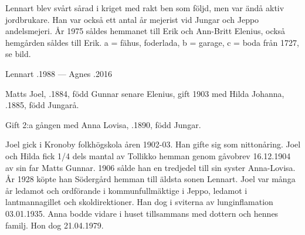 
Lennart blev svårt sårad i kriget med rakt ben som följd, men var ändå aktiv jordbrukare. Han var också ett antal år mejerist vid Jungar och Jeppo andelsmejeri. År 1975 såldes hemmanet till Erik och Ann-Britt Elenius, också hemgården såldes till Erik. a = fähus, foderlada, b = garage, c = boda från 1727, se bild.

Lennart .1988 --- Agnes .2016\jhvspace{}

%
Matts Joel, .1884, född Gunnar senare Elenius, gift 1903 med Hilda Johanna, .1885, född Jungarå.
\begin{jhchildren}
  \item {}
  \item {}
  \item {}
  \item {}
  \item {}
\end{jhchildren}


Gift 2:a gången med Anna Lovisa, .1890, född Jungar.
\begin{jhchildren}
  \item {}
  \item {}
  \item {}
\end{jhchildren}
Joel gick i Kronoby folkhögskola åren 1902-03. Han gifte sig som nittonåring. Joel och Hilda fick 1/4 dels mantal av Tollikko hemman genom gåvobrev 16.12.1904 av sin far Matts Gunnar. 1906 sålde han en tredjedel till sin syster Anna-Lovisa. År 1928 köpte han Södergård hemman till äldsta sonen Lennart. Joel var många år ledamot och ordförande i kommunfullmäktige i Jeppo, ledamot i lantmannagillet och skoldirektioner. Han dog i sviterna av lunginflamation 03.01.1935. Anna bodde vidare i huset tillsammans med dottern och hennes familj. Hon dog 21.04.1979.


